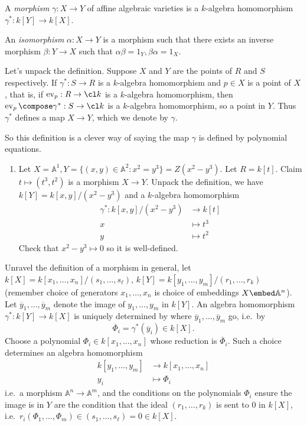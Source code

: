 \documentclass[a4paper]{article}
\renewcommand{\A}{\mathbb{A}}
\begin{document}
\begin{definition}[morphism]
  A \emph{morphism} \(\gamma: X \to Y\) of affine algebraic varieties is a \(k\)-algebra homomorphism \(\gamma^*: k[Y] \to k[X]\).

  An \emph{isomorphism} \(\alpha: X \to Y\) is a morphism such that there exists an inverse morphism \(\beta: Y \to X\) such that \(\alpha\beta = 1_Y, \beta\alpha = 1_X\).
\end{definition}

Let's unpack the definition. Suppose \(X\) and \(Y\) are the points of \(R\) and \(S\) respectively. If \(\gamma^*: S \to R\) is a \(k\)-algebra homomorphism and \(p \in X\) is a point of \(X\), that is, if \(\operatorname{ev}_p: R \to \cl k\) is a \(k\)-algebra homomorphism, then \(\operatorname{ev}_p \compose \gamma^*: S \to \cl k\) is a \(k\)-algebra homomorphism, so a point in \(Y\). Thus \(\gamma^*\) defines a map \(X \to Y\), which we denote by \(\gamma\).

So this definition is a clever way of saying the map \(\gamma\) is defined by polynomial equations.

\begin{eg}\leavevmode
  \begin{enumerate}
  \item Let \(X = \A^1, Y = \{(x, y) \in \A^2: x^2 = y^3\} = Z(x^2 - y^3)\). Let \(R = k[t]\). Claim \(t \mapsto (t^3, t^2)\) is a morphism \(X \to Y\). Unpack the definition, we have \(k[Y] = k[x, y]/(x^2 - y^3)\) and a \(k\)-algebra homomorphism
    \begin{align*}
      \gamma^*: k[x, y]/(x^2 - y^3) &\to k[t] \\
      x &\mapsto t^3 \\
      y &\mapsto t^2
    \end{align*}
    Check that \(x^2 - y^3 \mapsto 0\) so it is well-defined.
  \end{enumerate}
\end{eg}

Unravel the definition of a morphism in general, let \(k[X] = k[x_1, \dots, x_n]/(s_1, \dots, s_\ell)\), \(k[Y] = k[y_1, \dots, y_m]/(r_1, \dots, r_k)\) (remember choice of generators \(x_1, \dots, x_n\) is choice of embeddings \(X \embed \A^n\)). Let \(\overline y_1, \dots, \overline y_m\) denote the image of \(y_1, \dots, y_m\) in \(k[Y]\). An algebra homomorphism \(\gamma^*: k[Y] \to k[X]\) is uniquely determined by where \(\overline y_1, \dots, \overline y_m\) go, i.e.\ by
\[
  \overline \Phi_i = \gamma^*(\overline y_i) \in k[X].
\]
Choose a polynomial \(\Phi_i \in k[x_1, \dots, x_n]\) whose reduction is \(\overline \Phi_i\). Such a choice determines an algebra homomorphism
\begin{align*}
  k[y_1, \dots, y_m] &\to k[x_1, \dots, x_n] \\
  y_i &\mapsto \Phi_i
\end{align*}
i.e.\ a morphism \(\A^n \to \A^m\), and the conditions on the polynomials \(\Phi_i\) ensure the image is in \(Y\) are the condition that the ideal \((r_1, \dots, r_k)\) is sent to \(0\) in \(k[X]\), i.e.\ \(r_i(\Phi_1, \dots, \Phi_m) \in (s_1, \dots, s_\ell) = 0 \in k[X]\).
\end{document}
